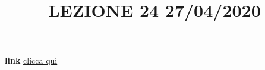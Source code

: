 \newline
\newline
\title{LEZIONE 24 27/04/2020}\newline
\textbf{link} \href{https://web.microsoftstream.com/video/630f3f79-2019-4aba-b98f-876f46cb01cf?list=user&userId=faa91214-a6f5-40d7-8875-253fd49b8ce1}{clicca qui}